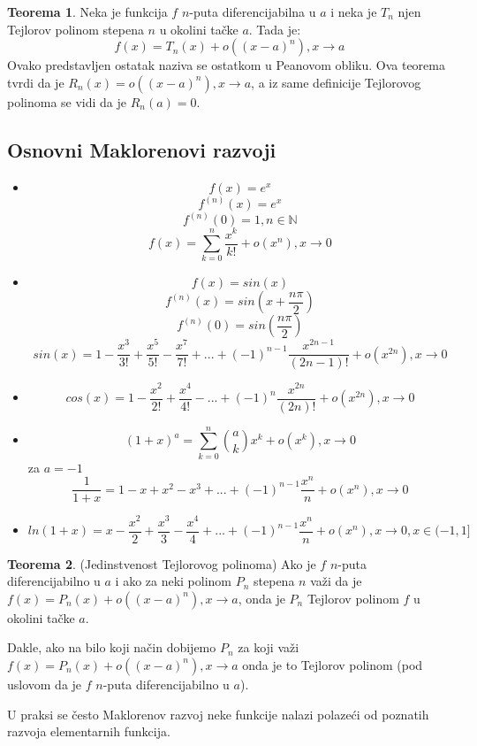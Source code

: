 \documentclass{article}
\theoremstyle{definition}
\newtheorem{theorem}{Teorema}[section]
\begin{document}
        \begin{theorem}
            Neka je funkcija $f$ $n$-puta diferencijabilna u $a$ i neka je $T_n$ njen Tejlorov polinom stepena $n$ u okolini tačke $a$. Tada je:
            $$f(x) = T_n(x) + o((x-a)^n), x \to a$$
            Ovako predstavljen ostatak naziva se ostatkom u Peanovom obliku. Ova teorema tvrdi da je $R_n(x) = o((x-a)^n), x \to a$, a iz same definicije Tejlorovog polinoma se vidi da je $R_n(a) = 0$.
        \end{theorem}

        \subsection{Osnovni Maklorenovi razvoji}
            \begin{itemize}
                \item
                $$f(x) = e^x$$
                $$f^{(n)}(x) = e^x$$
                $$f^{(n)}(0) = 1, n \in \mathbb{N}$$
                $$f(x) = \sum^{n}_{k = 0} \frac{x^k}{k!} + o(x^n), x \to 0$$
                \item
                $$f(x) = sin(x)$$
                $$f^{(n)}(x) = sin(x + \frac{n\pi}{2})$$
                $$f^{(n)}(0) = sin(\frac{n\pi}{2})$$
                $$sin(x) = 1 - \frac{x^3}{3!} + \frac{x^5}{5!} - \frac{x^7}{7!} + ... + (-1)^{n-1} \frac{x^{2n-1}}{(2n-1)!} + o(x^{2n}), x \to 0$$
                \item $$cos(x) = 1 - \frac{x^2}{2!} + \frac{x^4}{4!} - ... + (-1)^{n} \frac{x^{2n}}{(2n)!} + o(x^{2n}), x \to 0$$
                \item
                $$(1+x)^a = \sum^{n}_{k = 0} \binom{a}{k} x^k + o(x^k), x \to 0$$
                za $a = -1$
                $$\frac{1}{1+x} = 1 - x + x^2 - x^3 + ... + (-1)^{n-1} \frac{x^n}{n} + o(x^n), x \to 0$$
                \item $$ln(1 + x) = x - \frac{x^2}{2} + \frac{x^3}{3} - \frac{x^4}{4} + ... + (-1)^{n-1} \frac{x^n}{n} + o(x^n), x \to 0, x \in (-1, 1]$$
            \end{itemize}

        \begin{theorem}
            (Jedinstvenost Tejlorovog polinoma) Ako je $f$ $n$-puta diferencijabilno u $a$ i ako za neki polinom $P_n$ stepena $n$ važi da je $f(x) = P_n(x) + o((x-a)^n), x \to a$, onda je $P_n$ Tejlorov polinom $f$ u okolini tačke $a$.

            Dakle, ako na bilo koji način dobijemo $P_n$ za koji važi $f(x) = P_n(x) + o((x-a)^n), x \to a$ onda je to Tejlorov polinom (pod uslovom da je $f$ $n$-puta diferencijabilno u $a$).

            U praksi se često Maklorenov razvoj neke funkcije nalazi polazeći od poznatih razvoja elementarnih funkcija.
        \end{theorem}
\end{document}
